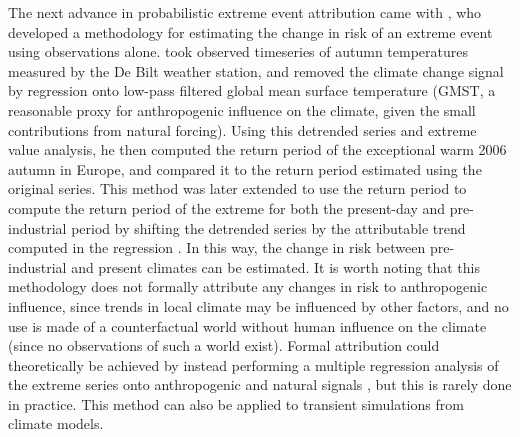     The next advance in probabilistic extreme event attribution came with \citet{van_oldenborgh_how_2007}, who developed a methodology for estimating the change in risk of an extreme event using observations alone. \citeauthor{van_oldenborgh_how_2007} took observed timeseries of autumn temperatures measured by the De Bilt weather station, and removed the climate change signal by regression onto low-pass filtered global mean surface temperature (GMST, a reasonable proxy for anthropogenic influence on the climate, given the small contributions from natural forcing). Using this detrended series and extreme value analysis, he then computed the return period of the exceptional warm 2006 autumn in Europe, and compared it to the return period estimated using the original series. This method was later extended to use the return period to compute the return period of the extreme for both the present-day and pre-industrial period by shifting the detrended series by the attributable trend computed in the regression \citep[eg.][]{philip_protocol_2020,leach_anthropogenic_2020}. In this way, the change in risk between pre-industrial and present climates can be estimated. It is worth noting that this methodology does not formally attribute any changes in risk to anthropogenic influence, since trends in local climate may be influenced by other factors, and no use is made of a counterfactual world without human influence on the climate (since no observations of such a world exist). Formal attribution could theoretically be achieved by instead performing a multiple regression analysis of the extreme series onto anthropogenic and natural signals \citep{haustein_real-time_2017}, but this is rarely done in practice. This method can also be applied to transient simulations from climate models.

